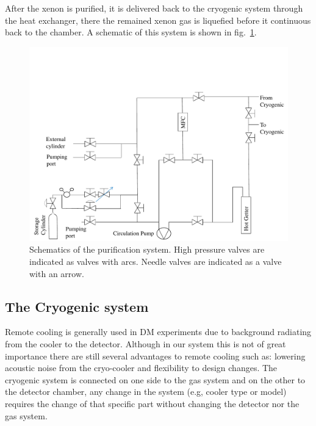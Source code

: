 After the xenon is purified, it is delivered back to the cryogenic system through the heat exchanger, there the remained xenon gas is 
liquefied before it continuous back to the chamber. A schematic of this system is shown in fig.~\ref{fig:gasSchematic}.


\begin{figure}[t!]
\centerline{\includegraphics[width=1.\linewidth]{GasSchematics.pdf}}
\caption{Schematics of the purification system. High pressure valves are indicated as valves with arcs. Needle valves are indicated as 
a valve with an arrow.}
\label{fig:gasSchematic}
\end{figure}

\subsection{The Cryogenic system}
\label{subsec:cryo}

Remote cooling is generally used in DM experiments due to background radiating from the cooler to the detector. Although in our system 
this is not of great importance there are still several advantages to remote cooling such as: lowering acoustic noise from the cryo-cooler 
and flexibility to design changes. The cryogenic system is connected on one side to the gas system and on the other to the detector chamber, 
any change in the system (e.g, cooler type or model) requires the change of that specific part without changing the detector nor the gas system.


